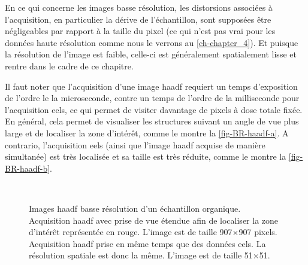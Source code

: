 En ce qui concerne les images basse résolution, les distorsions associées à l'acquisition, en particulier la dérive de l'échantillon, sont supposées être négligeables par rapport à la taille du pixel (ce qui n'est pas vrai pour les données haute résolution comme nous le verrons au \cref{ch-chapter_4}). Et puisque la résolution de l'image est faible, celle-ci est généralement spatialement lisse et rentre dans le cadre de ce chapitre.

Il faut noter que l'acquisition d'une image \gls{haadf} requiert un temps d'exposition de l'ordre le la microseconde, contre un temps de l'ordre de la milliseconde pour l'acquisition \gls{eels}, ce qui permet de visiter davantage de pixels à dose totale fixée. En général, cela permet de visualiser les structures suivant un angle de vue plus large et de localiser la zone d'intérêt, comme le montre la \cref{fig-BR-haadf-a}. A contrario, l'acquisition \gls{eels} (ainsi que l'image \gls{haadf} acquise de manière simultanée) est très localisée et sa taille est très réduite, comme le montre la \cref{fig-BR-haadf-b}.

\begin{figure}[t]
    \centering
    \hspace{1em}
    \\
    \caption{\protect\label{fig-BR-haadf}
        Images \gls{haadf} basse résolution d'un échantillon organique. 
         Acquisition \gls{haadf} avec prise de vue étendue afin de localiser la zone d'intérêt représentée en rouge. L'image est de taille 907$\times$907 pixels. 
         Acquisition \gls{haadf} prise en même temps que des données \gls{eels}. La résolution spatiale est donc la même. L'image est de taille 51$\times$51. 
    }
\end{figure}


